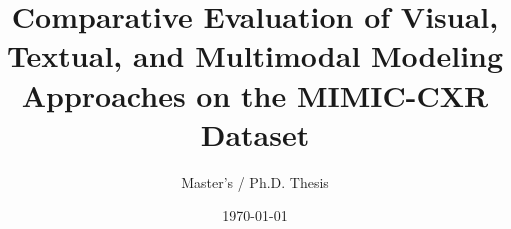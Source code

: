 \documentclass[12pt,a4paper]{report}
\begin{document}
\title{\textbf{Comparative Evaluation of Visual, Textual, and Multimodal Modeling Approaches on the MIMIC-CXR Dataset}}
\author{Master's / Ph.D. Thesis}
\date{\today}

\maketitle

\tableofcontents
\listoffigures
\listoftables

\newpage










\end{document}
